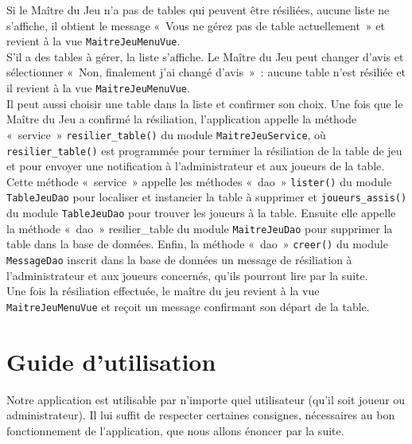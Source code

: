 \documentclass[11pt]{article}
\begin{document}
Si le Maître du Jeu n'a pas de tables qui peuvent être résiliées, aucune liste ne s'affiche, il obtient le message «~Vous ne gérez pas de table actuellement~» et revient à la vue \texttt{MaitreJeuMenuVue}.\\

S'il a des tables à gérer, la liste s'affiche. Le Maître du Jeu peut changer d'avis et sélectionner «~Non, finalement j'ai changé d'avis~»~: aucune table n'est résiliée et il revient à la vue \texttt{MaitreJeuMenuVue}.\\

Il peut aussi choisir une table dans la liste et confirmer son choix. Une fois que le Maître du Jeu a confirmé la résiliation, l'application appelle la méthode «~service~» \texttt{resilier\_table()} du module \texttt{MaitreJeuService}, où \texttt{resilier\_table()} est programmée pour terminer la résiliation de la table de jeu et pour envoyer une notification à l'administrateur et aux joueurs de la table. Cette méthode «~service~» appelle les méthodes «~dao~» \texttt{lister()} du module \texttt{TableJeuDao} pour localiser et instancier la table à supprimer et \texttt{joueurs\_assis()} du module \texttt{TableJeuDao} pour trouver les joueurs à la table. Ensuite elle appelle la méthode «~dao~» resilier\_table du module \texttt{MaitreJeuDao} pour supprimer la table dans la base de données. Enfin, la méthode «~dao~» \texttt{creer()} du module \texttt{MessageDao} inscrit dans la base de données un message de résiliation à l'administrateur et aux joueurs concernés, qu'ils pourront lire par la suite.\\

Une fois la résiliation effectuée, le maître du jeu revient à la vue \texttt{MaitreJeuMenuVue} et reçoit un message confirmant son départ de la table.



\newpage
\section{Guide d'utilisation}

Notre application est utilisable par n'importe quel utilisateur (qu’il soit joueur ou administrateur). Il lui suffit de respecter certaines consignes, nécessaires au bon fonctionnement de l’application, que nous allons énoncer par la suite. 
\end{document}
